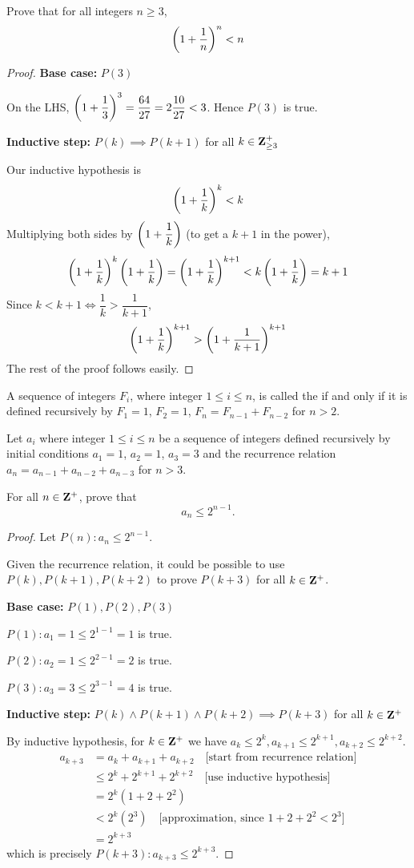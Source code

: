 \begin{prbm}
Prove that for all integers $n \ge 3$, 
\[ \left(1+\frac{1}{n}\right)^n<n \]
\end{prbm}

\begin{proof}
\textbf{Base case:} $P(3)$

On the LHS, $\left(1+\dfrac{1}{3}\right)^3=\dfrac{64}{27}=2\dfrac{10}{27}<3$. Hence $P(3)$ is true.

\textbf{Inductive step:} $P(k)\implies P(k+1)$ for all $k\in\mathbf Z^+_{\ge3}$

Our inductive hypothesis is
\[ \left(1+\frac{1}{k}\right)^k<k \]
Multiplying both sides by $\left(1+\dfrac{1}{k}\right)$ (to get a $k+1$ in the power),
\[ \left(1+\frac{1}{k}\right)^k\left(1+\frac{1}{k}\right)=\left(1+\frac{1}{k}\right)^{k+1}<k\left(1+\frac{1}{k}\right)=k+1  \]
Since $k<k+1 \iff \dfrac{1}{k}>\dfrac{1}{k+1}$, 
\[ \left(1+\frac{1}{k}\right)^{k+1} > \left(1+\frac{1}{k+1}\right)^{k+1} \]
The rest of the proof follows easily.
\end{proof}

A sequence of integers $F_i$, where integer $1\le i\le n$, is called the  if and only if it is defined recursively by $F_1=1$, $F_2=1$, $F_n=F_{n-1}+F_{n-2}$ for $n>2$.

\begin{prbm}
Let $a_i$ where integer $1\le i\le n$ be a sequence of integers defined recursively by initial conditions $a_1=1$, $a_2=1$, $a_3=3$ and the recurrence relation $a_n=a_{n-1}+a_{n-2}+a_{n-3}$ for $n>3$.

For all $n\in\mathbf Z^+$, prove that
\[ a_n\le2^{n-1}. \]
\end{prbm}

\begin{proof}
Let $P(n):a_n\le2^{n-1}$.

Given the recurrence relation, it could be possible to use $P(k),P(k+1),P(k+2)$ to prove $P(k+3)$ for all $k\in\mathbf Z^+$.

\textbf{Base case:} $P(1),P(2),P(3)$

$P(1):a_1=1\le2^{1-1}=1$ is true.

$P(2):a_2=1\le2^{2-1}=2$ is true.

$P(3):a_3=3\le2^{3-1}=4$ is true.

\textbf{Inductive step:} $P(k)\land P(k+1)\land P(k+2)\implies P(k+3)$ for all $k\in\mathbf Z^+$

By inductive hypothesis, for $k\in\mathbf Z^+$ we have $a_k\le2^k, a_{k+1}\le2^{k+1}, a_{k+2}\le2^{k+2}$.
\begin{align*}
a_{k+3} &= a_k+a_{k+1}+a_{k+2} \quad \text{[start from recurrence relation]} \\
&\le 2^k+2^{k+1}+2^{k+2} \quad \text{[use inductive hypothesis]} \\
&= 2^k(1+2+2^2) \\
&< 2^k(2^3) \quad \text{[approximation, since $1+2+2^2<2^3$]} \\
&= 2^{k+3}
\end{align*}
which is precisely $P(k+3):a_{k+3}\le2^{k+3}$.
\end{proof}

